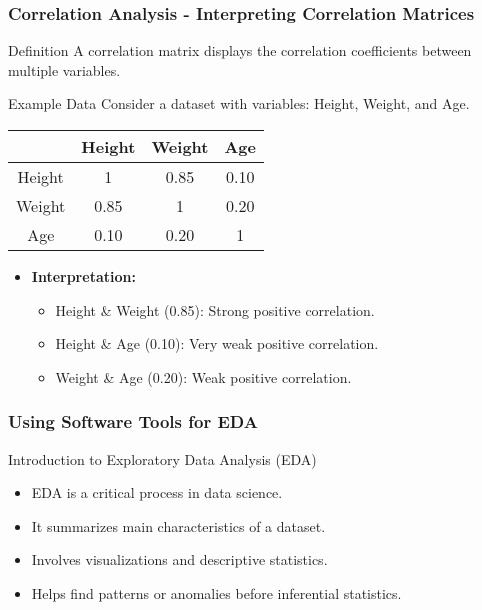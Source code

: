 \documentclass[aspectratio=169]{beamer}
\begin{document}
\begin{frame}[fragile]
    \frametitle{Correlation Analysis - Interpreting Correlation Matrices}
    \begin{block}{Definition}
        A correlation matrix displays the correlation coefficients between multiple variables.
    \end{block}
    
    \begin{exampleblock}{Example Data}
        Consider a dataset with variables: Height, Weight, and Age.
        \begin{center}
            \begin{tabular}{|c|c|c|c|}
                \hline
                & Height & Weight & Age \\
                \hline
                Height & 1 & 0.85 & 0.10 \\
                Weight & 0.85 & 1 & 0.20 \\
                Age & 0.10 & 0.20 & 1 \\
                \hline
            \end{tabular}
        \end{center}
    \end{exampleblock}
    
    \begin{itemize}
        \item \textbf{Interpretation:}
        \begin{itemize}
            \item Height \& Weight (0.85): Strong positive correlation.
            \item Height \& Age (0.10): Very weak positive correlation.
            \item Weight \& Age (0.20): Weak positive correlation.
        \end{itemize}
    \end{itemize}
\end{frame}

\begin{frame}
    \frametitle{Using Software Tools for EDA}
    \begin{block}{Introduction to Exploratory Data Analysis (EDA)}
        \begin{itemize}
            \item EDA is a critical process in data science.
            \item It summarizes main characteristics of a dataset.
            \item Involves visualizations and descriptive statistics.
            \item Helps find patterns or anomalies before inferential statistics.
        \end{itemize}
    \end{block}
\end{frame}
\end{document}
